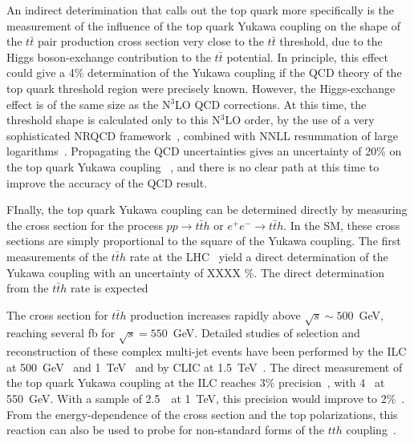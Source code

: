An indirect deterimination that calls out the top quark more
specifically is the measurement of the influence of the top quark
Yukawa coupling on the shape of the  $t\bar{t}$ pair production 
cross section very close to the $t\bar{t}$ threshold, due to the Higgs
boson-exchange contribution to the $t\bar t$ potential. In principle,
this effect could give a 4\% determination of the Yukawa coupling if
the QCD  theory of the top quark threshold region were precisely
known.   However, the Higgs-exchange effect is of the same size as
the N$^3$LO QCD corrections.  At this time, the threshold shape is
calculated only to this N$^3$LO order, by the use of a very sophisticated
NRQCD framework~\cite{Beneke:2015kwa}, combined with NNLL resummation of
large logarithms~\cite{Hoang:2013uda}.   Propagating the QCD
uncertainties gives an uncertainty of 20\% on the top quark Yukawa
coupling~\cite{Vos:2016til} , and there is no clear path at this time to improve the
accuracy of the QCD result.

 FInally, the top quark Yukawa coupling can be determined directly by
 measuring the cross section for the process $pp \rightarrow t\bar{t}h$ or
$e^+e^- \rightarrow t\bar{t}h$.  In the SM, these cross sections are simply
proportional to the square of the Yukawa coupling. The first measurements
of the $t\bar{t}h$ rate at the LHC~\cite{} yield a direct determination of 
the Yukawa coupling with an uncertainty of XXXX \%. The direct determination
from the $t\bar{t}h$ rate is expected

The cross 
section for $t\bar{t}h$ production increases rapidly above $\sqrt{s} \sim 500 $~GeV,
reaching several fb for $\sqrt{s} = 550$~GeV. Detailed studies of
selection
 and reconstruction of these complex multi-jet events
have been performed by the ILC at 500~GeV~\cite{Yonamine:2011jg} and
 1~TeV~\cite{Behnke:2013lya,Price:2014oca} and by CLIC
at 1.5~TeV~\cite{Abramowicz:2018rjq}. The direct measurement of the
top
 quark Yukawa coupling at the ILC reaches 3\%
precision~\cite{Fujii:2015jha}, with 4~\iab{} at 550~GeV.  With a sample of
2.5~\iab\  at 
1~TeV, this precision would improve to 2\%~\cite{Asner:2013psa}.  From
the energy-dependence of the cross section and the top polarizations,
this reaction can also be used to probe for non-standard forms of the
$tth$ coupling~\cite{Han:1999xd}.

